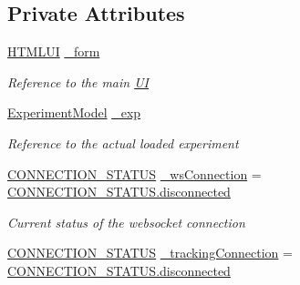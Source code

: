 \subsection*{Private Attributes}
\begin{DoxyCompactItemize}
\item 
\hyperlink{class_web_analyzer_1_1_u_i_1_1_h_t_m_l_u_i}{H\+T\+M\+L\+U\+I} \hyperlink{class_web_analyzer_1_1_u_i_1_1_interaction_objects_1_1_experiment_object_a5a2cb9630e25671701fa7d900d4fec83}{\+\_\+form}
\begin{DoxyCompactList}\small\item\em Reference to the main \hyperlink{namespace_web_analyzer_1_1_u_i}{U\+I} \end{DoxyCompactList}\item 
\hyperlink{class_web_analyzer_1_1_models_1_1_base_1_1_experiment_model}{Experiment\+Model} \hyperlink{class_web_analyzer_1_1_u_i_1_1_interaction_objects_1_1_experiment_object_a8275ff9c2a3971c6250a462e7e248843}{\+\_\+exp}
\begin{DoxyCompactList}\small\item\em Reference to the actual loaded experiment \end{DoxyCompactList}\item 
\hyperlink{class_web_analyzer_1_1_u_i_1_1_interaction_objects_1_1_experiment_object_a2875208b4f4b0ed643593152f4ec025c}{C\+O\+N\+N\+E\+C\+T\+I\+O\+N\+\_\+\+S\+T\+A\+T\+U\+S} \hyperlink{class_web_analyzer_1_1_u_i_1_1_interaction_objects_1_1_experiment_object_a37bc6281799039ec5d51c400ddb07ca0}{\+\_\+ws\+Connection} = \hyperlink{class_web_analyzer_1_1_u_i_1_1_interaction_objects_1_1_experiment_object_a2875208b4f4b0ed643593152f4ec025ca3a561116f0c9675a3c83d21fa365050d}{C\+O\+N\+N\+E\+C\+T\+I\+O\+N\+\_\+\+S\+T\+A\+T\+U\+S.\+disconnected}
\begin{DoxyCompactList}\small\item\em Current status of the websocket connection \end{DoxyCompactList}\item 
\hyperlink{class_web_analyzer_1_1_u_i_1_1_interaction_objects_1_1_experiment_object_a2875208b4f4b0ed643593152f4ec025c}{C\+O\+N\+N\+E\+C\+T\+I\+O\+N\+\_\+\+S\+T\+A\+T\+U\+S} \hyperlink{class_web_analyzer_1_1_u_i_1_1_interaction_objects_1_1_experiment_object_a7cb71354914a07dab1f19146216aa777}{\+\_\+tracking\+Connection} = \hyperlink{class_web_analyzer_1_1_u_i_1_1_interaction_objects_1_1_experiment_object_a2875208b4f4b0ed643593152f4ec025ca3a561116f0c9675a3c83d21fa365050d}{C\+O\+N\+N\+E\+C\+T\+I\+O\+N\+\_\+\+S\+T\+A\+T\+U\+S.\+disconnected}

\end{DoxyCompactItemize}
